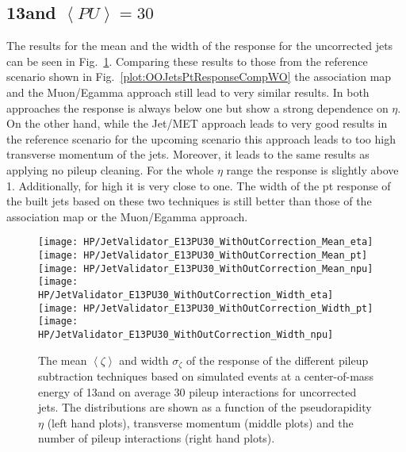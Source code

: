 \subsection{13\TeV and $\left<PU\right> =30$ \label{sec:HPUJetE13PU30}}

The results for the mean and the width of the \pt{} response for the uncorrected jets can be seen in Fig.~\ref{plot:HPUJetE13PU30WO}. Comparing these results to those from the reference scenario shown in Fig.~\ref{plot:OOJetsPtResponseCompWO} the association map and the Muon/Egamma approach still lead to very similar results. In both approaches the \pt{} response is always below one but show a strong dependence on $\eta$. On the other hand, while the Jet/MET approach leads to very good results in the reference scenario for the upcoming scenario this approach leads to too high transverse momentum of the jets. Moreover, it leads to the same results as applying no pileup cleaning. For the whole $\eta$ range the \pt{} response is slightly above 1. Additionally, for high \pt{} it is very close to one. The width of the pt response of the built jets based on these two techniques is still better than those of the association map or the Muon/Egamma approach.

\begin{figure}[Ht]
  \centering
  \texttt{[image: HP/JetValidator\_E13PU30\_WithOutCorrection\_Mean\_eta]}
  \texttt{[image: HP/JetValidator\_E13PU30\_WithOutCorrection\_Mean\_pt]}
  \texttt{[image: HP/JetValidator\_E13PU30\_WithOutCorrection\_Mean\_npu]}
  \\
  \texttt{[image: HP/JetValidator\_E13PU30\_WithOutCorrection\_Width\_eta]}
  \texttt{[image: HP/JetValidator\_E13PU30\_WithOutCorrection\_Width\_pt]}
  \texttt{[image: HP/JetValidator\_E13PU30\_WithOutCorrection\_Width\_npu]}
  \caption[Mean and width of the \pt{} response of different pileup subtraction techniques based on simulated \ttbar events with 13\TeV and $\left<PU\right>=30$ for uncorrected jets]{The mean $\left<\zeta\right>$ and width $\sigma_{\zeta}$ of the \pt{} response of the different pileup subtraction techniques based on simulated \ttbar events at a center-of-mass energy of 13\TeV and on average 30 pileup interactions for uncorrected jets. The distributions are shown as a function of the pseudorapidity $\eta$ (left hand plots), transverse momentum (middle plots) and the number of pileup interactions (right hand plots). \label{plot:HPUJetE13PU30WO}}
\end{figure}

